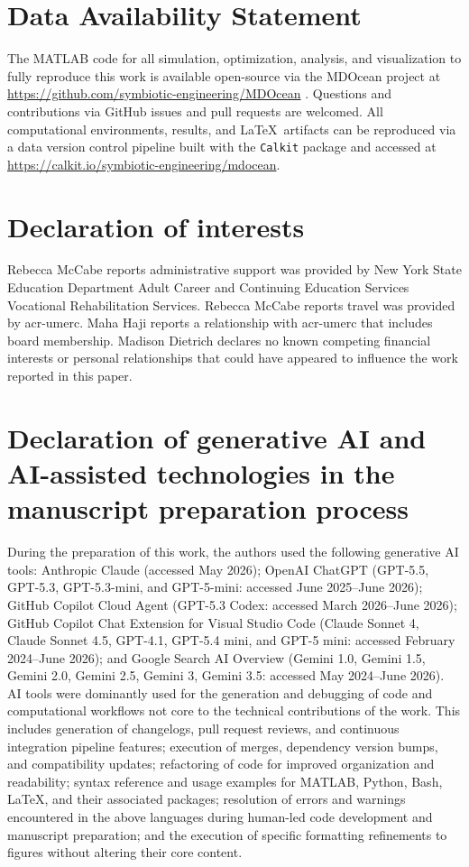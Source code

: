 \documentclass[a4paper,fleqn,colorlinks]{cas-dc}
\begin{document}
\section*{Data Availability Statement}
The MATLAB code for all simulation, optimization, analysis, and visualization to fully reproduce this work is available open-source via the MDOcean project at \url{https://github.com/symbiotic-engineering/MDOcean} \citep{mccabe_mdocean_2024}.
Questions and contributions via GitHub issues and pull requests are welcomed.
All computational environments, results, and \LaTeX~artifacts can be reproduced via a data version control pipeline built with the \texttt{Calkit} package
and accessed at \url{https://calkit.io/symbiotic-engineering/mdocean}.

\section*{Declaration of interests}
Rebecca McCabe reports administrative support was provided by New York State Education Department Adult Career and Continuing Education Services Vocational Rehabilitation Services.
Rebecca McCabe reports travel was provided by \gls{acr-umerc}.
Maha Haji reports a relationship with \gls{acr-umerc} that includes board membership. 
Madison Dietrich declares no known competing financial interests or personal relationships that could have appeared to influence the work reported in this paper.

\section*{Declaration of generative AI and AI-assisted technologies in the manuscript preparation process}
During the preparation of this work, the authors used the following generative AI tools:
Anthropic Claude (accessed May 2026);
OpenAI ChatGPT (GPT-5.5, GPT-5.3, GPT-5.3-mini, and GPT-5-mini: accessed June 2025--June 2026);
GitHub Copilot Cloud Agent (GPT-5.3 Codex: accessed March 2026--June 2026);
GitHub Copilot Chat Extension for Visual Studio Code (Claude Sonnet 4, Claude Sonnet 4.5, GPT-4.1, GPT-5.4 mini, and GPT-5 mini: accessed February 2024--June 2026); and
Google Search AI Overview (Gemini 1.0, Gemini 1.5, Gemini 2.0, Gemini 2.5, Gemini 3, Gemini 3.5: accessed May 2024--June 2026).
AI tools were dominantly used for the generation and debugging of code and computational workflows not core to the technical contributions of the work.
This includes generation of changelogs, pull request reviews, and continuous integration pipeline features;
execution of merges, dependency version bumps, and compatibility updates;
refactoring of code for improved organization and readability;
syntax reference and usage examples for MATLAB, Python, Bash, \LaTeX, and their associated packages;
resolution of errors and warnings encountered in the above languages during human-led code development and manuscript preparation;
and the execution of specific formatting refinements to figures without altering their core content.
\end{document}
